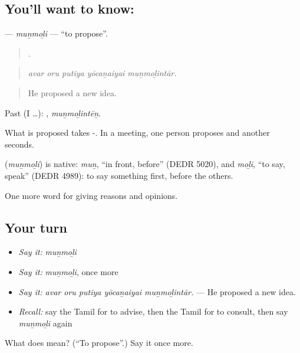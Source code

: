\subsection*{You'll want to know: }
\textbf{} — \emph{muṉmoḻi} — \textquotedblleft{}to propose\textquotedblright{}.

\begin{quote}
    .
\end{quote}

\begin{quote}
\emph{avar oru putiya yōcaṉaiyai muṉmoḻintār.}
\end{quote}

\begin{quote}
He proposed a new idea.
\end{quote}

Past (I …): , \emph{muṉmoḻintēṉ}.

What is proposed takes -. In a meeting, one person proposes and another seconds.

\begin{cousinweb}
\textbf{} (\emph{muṉmoḻi}) is native: \emph{muṉ}, \textquotedblleft{}in front, before\textquotedblright{} (DEDR 5020), and \emph{moḻi}, \textquotedblleft{}to say, speak\textquotedblright{} (DEDR 4989): to say something first, before the others.
\end{cousinweb}

\begin{grammarlens}[title={What you've built}]
One more word for giving reasons and opinions.
\end{grammarlens}

\subsection*{Your turn}
\begin{itemize}
\raggedright
  \item \emph{Say it:} \emph{muṉmoḻi}
  \item \emph{Say it:} \emph{muṉmoḻi}, once more
  \item \emph{Say it:} \emph{avar oru putiya yōcaṉaiyai muṉmoḻintār.} — He proposed a new idea.
  \item \emph{Recall:} say the Tamil for to advise, then the Tamil for to consult, then say \emph{muṉmoḻi} again
\end{itemize}

\begin{tcolorbox}[breakable,colback=teal!4,colframe=teal!35!black,title={Before you move on}]
What does  mean? (\textquotedblleft{}To propose\textquotedblright{}.) Say it once more.
\end{tcolorbox}
